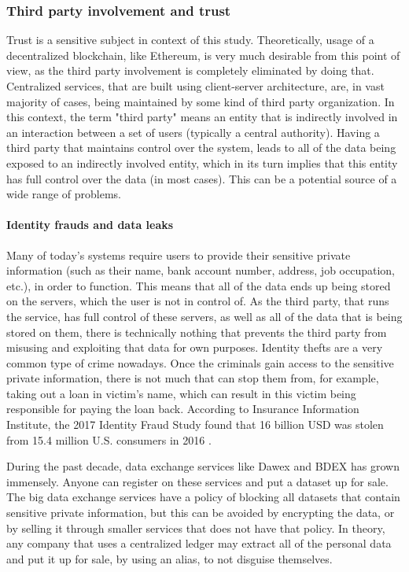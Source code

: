 \subsubsection{Third party involvement and trust} \label{section:analysisthirdparty}
Trust is a sensitive subject in context of this study. Theoretically, usage of a decentralized blockchain, like Ethereum, is very much desirable from this point of view, as the third party involvement is completely eliminated by doing that. Centralized services, that are built using client-server architecture, are, in vast majority of cases, being maintained by some kind of third party organization. In this context, the term "third party" means an entity that is indirectly involved in an interaction between a set of users (typically a central authority). Having a third party that maintains control over the system, leads to all of the data being exposed to an indirectly involved entity, which in its turn implies that this entity has full control over the data (in most cases). This can be a potential source of a wide range of problems.

\paragraph{Identity frauds and data leaks}
Many of today's systems require users to provide their sensitive private information (such as their name, bank account number, address, job occupation, etc.), in order to function. This means that all of the data ends up being stored on the servers, which the user is not in control of. As the third party, that runs the service, has full control of these servers, as well as all of the data that is being stored on them, there is technically nothing that prevents the third party from misusing and exploiting that data for own purposes. Identity thefts are a very common type of crime nowadays. Once the criminals gain access to the sensitive private information, there is not much that can stop them from, for example, taking out a loan in victim's name, which can result in this victim being responsible for paying the loan back. According to Insurance Information Institute, the 2017 Identity Fraud Study found that 16 billion USD was stolen from 15.4 million U.S. consumers in 2016 \citep{idthefts}.

During the past decade, data exchange services like Dawex and BDEX has grown immensely. Anyone can register on these services and put a dataset up for sale. The big data exchange services have a policy of blocking all datasets that contain sensitive private information, but this can be avoided by encrypting the data, or by selling it through smaller services that does not have that policy. In theory, any company that uses a centralized ledger may extract all of the personal data and put it up for sale, by using an alias, to not disguise themselves.

